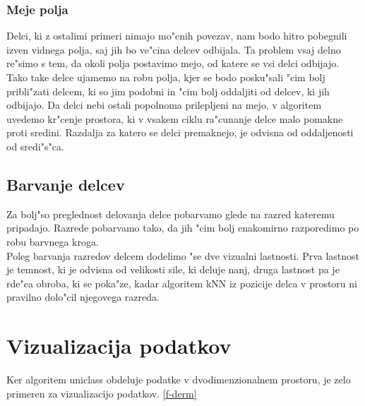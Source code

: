 \documentclass[a4paper]{article}
\begin{document}
		\subsubsection{Meje polja}
			Delci, ki z ostalimi primeri nimajo mo"cnih povezav, nam bodo hitro pobegnili izven vidnega polja, saj jih bo ve"cina delcev odbijala. Ta problem vsaj delno re"simo s tem, da okoli polja postavimo mejo, od katere se vsi delci odbijajo. Tako take delce ujamemo na robu polja, kjer se bodo posku"sali "cim bolj pribli"zati delcem, ki so jim podobni in "cim bolj oddaljiti od delcev, ki jih odbijajo. Da delci nebi ostali popolnoma prilepljeni na mejo, v algoritem uvedemo kr"cenje prostora, ki v vsakem ciklu ra"cunanje delce malo pomakne proti sredini. Razdalja za katero se delci premaknejo, je odvisna od oddaljenosti od sredi"s"ca.
	
	\subsection{Barvanje delcev}
		Za bolj"so preglednost delovanja delce pobarvamo glede na razred kateremu pripadajo. Razrede pobarvamo tako, da jih "cim bolj enakomirno razporedimo po robu barvnega kroga. \\
		Poleg barvanja razredov delcem dodelimo "se dve vizualni lastnosti. Prva lastnost je temnost, ki je odvisna od velikosti sile, ki deluje nanj, druga lastnost pa je rde"ca obroba, ki se poka"ze, kadar algoritem kNN iz pozicije delca v prostoru ni pravilno dolo"cil njegovega razreda.

\section{Vizualizacija podatkov}
	Ker algoritem uniclass obdeluje podatke v dvodimenzionalnem prostoru, je zelo primeren za vizualizacijo podatkov. 
	\ref{f-derm}	
	
\end{document}
